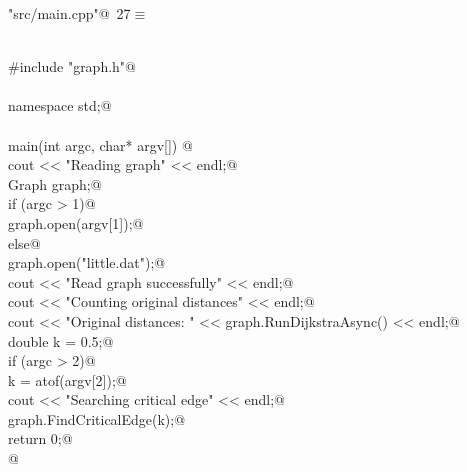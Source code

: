 \documentclass[12pt]{article}
\begin{document}
\begin{flushleft} \small
\begin{minipage}{\linewidth}\label{scrap42}\raggedright\small
{} \verb@"src/main.cpp"@\nobreak\ {\footnotesize {27}}$\equiv$
\vspace{-1ex}
\begin{list}{}{} \item
\mbox{}\verb@@\\
\mbox{}\verb@#include "graph.h"@\\
\mbox{}\verb@@\\
\mbox{}\verb@using namespace std;@\\
\mbox{}\verb@@\\
\mbox{}\verb@int main(int argc, char* argv[]) {@\\
\mbox{}\verb@    cout << "Reading graph" << endl;@\\
\mbox{}\verb@    Graph graph;@\\
\mbox{}\verb@    if (argc > 1)@\\
\mbox{}\verb@        graph.open(argv[1]);@\\
\mbox{}\verb@    else@\\
\mbox{}\verb@        graph.open("little.dat");@\\
\mbox{}\verb@    cout << "Read graph successfully" << endl;@\\
\mbox{}\verb@    cout << "Counting original distances" << endl;@\\
\mbox{}\verb@    cout << "Original distances: " << graph.RunDijkstraAsync() << endl;@\\
\mbox{}\verb@    double k = 0.5;@\\
\mbox{}\verb@    if (argc > 2)@\\
\mbox{}\verb@        k = atof(argv[2]);@\\
\mbox{}\verb@    cout << "Searching critical edge" << endl;@\\
\mbox{}\verb@    graph.FindCriticalEdge(k);@\\
\mbox{}\verb@    return 0;@\\
\mbox{}\verb@}@\\
\mbox{}\verb@@{\NWsep}
\end{list}
\vspace{-1.5ex}
\footnotesize
\begin{list}{}{\setlength{\itemsep}{-\parsep}\setlength{\itemindent}{-\leftmargin}}

\item{}
\end{list}
\end{minipage}\vspace{4ex}
\end{flushleft}
\end{document}
